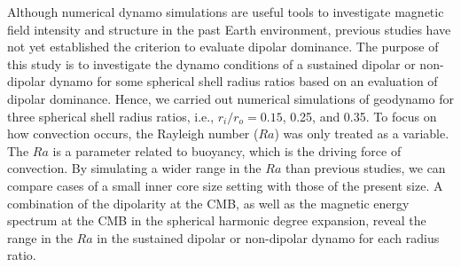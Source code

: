 Although numerical dynamo simulations are useful tools to investigate magnetic field intensity and structure in the past Earth environment, previous studies have not yet established the criterion to evaluate dipolar dominance. The purpose of this study is to investigate the dynamo conditions of a sustained dipolar or non-dipolar dynamo for some spherical shell radius ratios based on an evaluation of dipolar dominance. Hence, we carried out numerical simulations of geodynamo for three spherical shell radius ratios, i.e., $r_{i} / r_{o} = 0.15$, 0.25, and 0.35. To focus on how convection occurs, the Rayleigh number ($Ra$) was only treated as a variable. The $Ra$ is a parameter related to buoyancy, which is the driving force of convection. By simulating a wider range in the $Ra$ than previous studies, we can compare cases of a small inner core size setting with those of the present size. A combination of the dipolarity at the CMB, as well as the magnetic energy spectrum at the CMB in the spherical harmonic degree expansion, reveal the range in the $Ra$ in the sustained dipolar or non-dipolar dynamo for each radius ratio.
